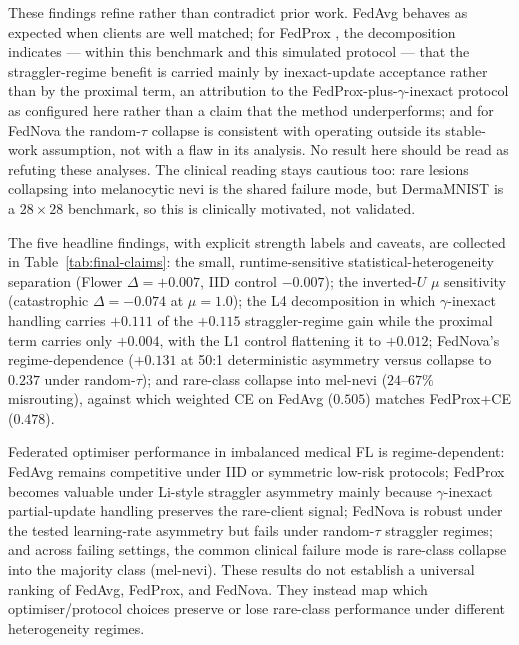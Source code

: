 \documentclass[11pt,a4paper]{report}
\begin{document}
These findings refine rather than contradict prior work. FedAvg
\citep{mcmahan2017fedavg} behaves as expected when clients are well matched; for
FedProx \citep{li2020fedprox}, the decomposition indicates --- within this
benchmark and this simulated protocol --- that the straggler-regime benefit is
carried mainly by inexact-update acceptance rather than by the proximal term, an
attribution to the FedProx-plus-$\gamma$-inexact protocol as configured here
rather than a claim that the method underperforms; and for FedNova
\citep{wang2020fednova} the random-$\tau$ collapse is consistent with operating
outside its stable-work assumption, not with a flaw in its analysis. No result
here should be read as refuting these analyses. The clinical reading stays
cautious too: rare lesions collapsing into melanocytic nevi is the shared failure
mode, but DermaMNIST is a $28 \times 28$ benchmark, so this is clinically
motivated, not validated.

The five headline findings, with explicit strength labels and caveats, are
collected in Table~\ref{tab:final-claims}: the small, runtime-sensitive
statistical-heterogeneity separation (Flower $\Delta = +0.007$, IID control
$-0.007$); the inverted-$U$ $\mu$ sensitivity (catastrophic $\Delta = -0.074$ at
$\mu = 1.0$); the L4 decomposition in which $\gamma$-inexact handling carries
$+0.111$ of the $+0.115$ straggler-regime gain while the proximal term carries
only $+0.004$, with the L1 control flattening it to $+0.012$; FedNova's
regime-dependence ($+0.131$ at 50:1 deterministic asymmetry versus collapse to
$0.237$ under random-$\tau$); and rare-class collapse into mel-nevi ($24$--$67\%$
misrouting), against which weighted CE on FedAvg ($0.505$) matches FedProx+CE
($0.478$).

Federated optimiser performance in imbalanced medical FL is regime-dependent:
FedAvg remains competitive under IID or symmetric low-risk protocols;
FedProx becomes valuable under Li-style straggler asymmetry mainly because
$\gamma$-inexact partial-update handling preserves the rare-client signal;
FedNova is robust under the tested learning-rate asymmetry but fails under
random-$\tau$ straggler regimes; and across failing settings, the common
clinical failure mode is rare-class collapse into the majority class
(mel-nevi). These results do not establish a universal ranking of FedAvg,
FedProx, and FedNova. They instead map which optimiser/protocol choices
preserve or lose rare-class performance under different heterogeneity
regimes.
\end{document}
